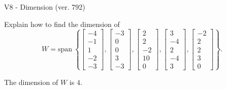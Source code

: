 \begin{exercise}
  \begin{exerciseTitle}V8 - Dimension (ver. 792)\end{exerciseTitle}
  \begin{exerciseStatement}
    Explain how to find the dimension of 
\[W=\mathrm{span}\ \left\{\left[\begin{array}{r}
-4 \\
-1 \\
1 \\
-2 \\
-3
\end{array}\right] , \left[\begin{array}{r}
-3 \\
0 \\
0 \\
3 \\
-3
\end{array}\right] , \left[\begin{array}{r}
2 \\
2 \\
-2 \\
10 \\
0
\end{array}\right] , \left[\begin{array}{r}
3 \\
-4 \\
2 \\
-4 \\
3
\end{array}\right] , \left[\begin{array}{r}
-2 \\
2 \\
2 \\
3 \\
0
\end{array}\right]\right\}.\]



  \end{exerciseStatement}
  \begin{exerciseAnswer}
   The dimension of \(W\) is  \(4\).
  


  \end{exerciseAnswer}
\end{exercise}